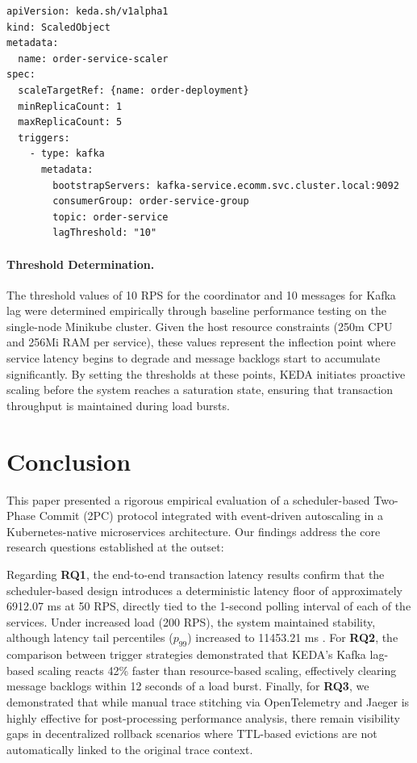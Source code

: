 \documentclass[]{USG}
\begin{document}
\begin{lstlisting}[style=yamlStyle, title={\textbf{Listing 2: KEDA ScaledObject --- Participant Services (Kafka Trigger)}}, frame=single, backgroundcolor=\color{gray!5}, rulecolor=\color{gray!30}]
apiVersion: keda.sh/v1alpha1
kind: ScaledObject
metadata:
  name: order-service-scaler
spec:
  scaleTargetRef: {name: order-deployment}
  minReplicaCount: 1
  maxReplicaCount: 5
  triggers:
    - type: kafka
      metadata:
        bootstrapServers: kafka-service.ecomm.svc.cluster.local:9092
        consumerGroup: order-service-group
        topic: order-service
        lagThreshold: "10"
\end{lstlisting}

\paragraph{Threshold Determination.}
The threshold values of 10 RPS for the coordinator and 10 messages for Kafka lag were determined empirically through baseline performance testing on the single-node Minikube cluster. Given the host resource constraints (250m CPU and 256Mi RAM per service), these values represent the inflection point where service latency begins to degrade and message backlogs start to accumulate significantly. By setting the thresholds at these points, KEDA initiates proactive scaling before the system reaches a saturation state, ensuring that transaction throughput is maintained during load bursts.

\section{Conclusion}
\label{sec:conclusion}

This paper presented a rigorous empirical evaluation of a scheduler-based Two-Phase Commit (2PC) protocol integrated with event-driven autoscaling in a Kubernetes-native microservices architecture. Our findings address the core research questions established at the outset:

Regarding \textbf{RQ1}, the end-to-end transaction latency results confirm that the scheduler-based design introduces a deterministic latency floor of approximately 6912.07 ms at 50 RPS, directly tied to the 1-second polling interval of each of the services. Under increased load (200 RPS), the system maintained stability, although latency tail percentiles ($p_{99}$) increased to 11453.21 ms . For \textbf{RQ2}, the comparison between trigger strategies demonstrated that KEDA's Kafka lag-based scaling reacts 42\% faster than resource-based scaling, effectively clearing message backlogs within 12 seconds of a load burst. Finally, for \textbf{RQ3}, we demonstrated that while manual trace stitching via OpenTelemetry and Jaeger is highly effective for post-processing performance analysis, there remain visibility gaps in decentralized rollback scenarios where TTL-based evictions are not automatically linked to the original trace context.
\end{document}
